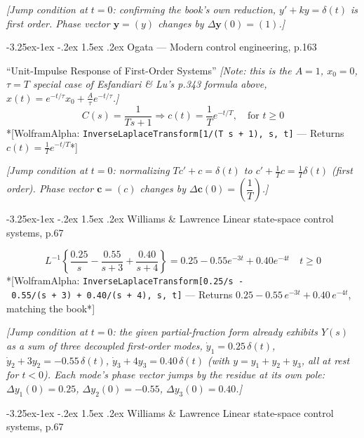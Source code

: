 \documentclass[
  11pt,
]{article}
\makeatletter
\providecommand{\implies}{\Longrightarrow}
\renewcommand\paragraph{\@startsection{paragraph}{4}{\z@}%
                                     {-3.25ex\@plus -1ex \@minus -.2ex}%
                                     {1.5ex \@plus .2ex}%
                                     {\normalfont\normalsize\bfseries}}
\makeatother
\begin{document}
\emph{{[}Jump condition at \(t=0\): confirming the book's own reduction,
\(y'+ky=\delta(t)\) is first order. Phase vector \(\mathbf y=(y)\)
changes by \(\Delta\mathbf y(0)=(1)\).{]}}

\hypertarget{ogata-modern-control-engineering-p.163}{%
\paragraph{Ogata --- Modern control engineering,
p.163}\label{ogata-modern-control-engineering-p.163}}

``Unit-Impulse Response of First-Order Systems'' \emph{{[}Note: this is
the \(A=1\), \(x_0=0\), \(\tau=T\) special case of Esfandiari \& Lu's
p.343 formula above,
\(x(t)=e^{-t/\tau}x_0+\frac{A}{\tau}e^{-t/\tau}\).{]}} \[
C(s) = \frac{1}{Ts + 1} \implies c(t) = \frac{1}{T} e^{-t/T}, \quad \text{for } t \geq 0
\] *{[}WolframAlpha:
\texttt{InverseLaplaceTransform{[}1/(T\ s\ +\ 1),\ s,\ t{]}} --- Returns
\(c(t) = \frac{1}{T} e^{-t/T}\)*{]}

\emph{{[}Jump condition at \(t=0\): normalizing \(Tc'+c=\delta(t)\) to
\(c'+\tfrac1T c=\tfrac1T\delta(t)\) (first order). Phase vector
\(\mathbf c=(c)\) changes by
\(\Delta\mathbf c(0)=\left(\dfrac1T\right)\).{]}}

\hypertarget{williams-lawrence-linear-state-space-control-systems-p.67}{%
\paragraph{Williams \& Lawrence Linear state-space control systems,
p.67}\label{williams-lawrence-linear-state-space-control-systems-p.67}}

\[L^{-1} \left\{ \frac{0.25}{s} - \frac{0.55}{s+3} + \frac{0.40}{s+4} \right\}
= 0.25 - 0.55e^{-3t} + 0.40e^{-4t} \quad t \geq 0
\] *{[}WolframAlpha:
\texttt{InverseLaplaceTransform{[}0.25/s\ -\ 0.55/(s\ +\ 3)\ +\ 0.40/(s\ +\ 4),\ s,\ t{]}}
--- Returns \(0.25 - 0.55\,e^{-3t} + 0.40\,e^{-4t}\), matching the
book*{]}

\emph{{[}Jump condition at \(t=0\): the given partial-fraction form
already exhibits \(Y(s)\) as a sum of three decoupled first-order modes,
\(\dot y_1 = 0.25\,\delta(t)\), \(\dot y_2+3y_2=-0.55\,\delta(t)\),
\(\dot y_3+4y_3=0.40\,\delta(t)\) (with \(y=y_1+y_2+y_3\), all at rest
for \(t<0\)). Each mode's phase vector jumps by the residue at its own
pole: \(\Delta y_1(0)=0.25\), \(\Delta y_2(0)=-0.55\),
\(\Delta y_3(0)=0.40\).{]}}

\hypertarget{williams-lawrence-linear-state-space-control-systems-p.67-1}{%
\paragraph{Williams \& Lawrence Linear state-space control systems,
p.67}\label{williams-lawrence-linear-state-space-control-systems-p.67-1}}
\end{document}
